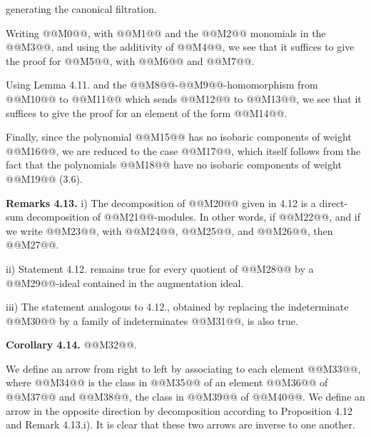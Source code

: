 generating the canonical filtration.

Writing @@M0@@, with @@M1@@ and the @@M2@@ monomials in the @@M3@@, and using the additivity of @@M4@@, we see that it suffices to give the proof for @@M5@@, with @@M6@@ and @@M7@@.

Using Lemma 4.11. and the @@M8@@-@@M9@@-homomorphism from @@M10@@ to @@M11@@ which sends @@M12@@ to @@M13@@, we see that it suffices to give the proof for an element of the form @@M14@@.

Finally, since the polynomial @@M15@@ has no isobaric components of weight @@M16@@, we are reduced to the case @@M17@@, which itself follows from the fact that the polynomials @@M18@@ have no isobaric components of weight @@M19@@ (3.6).

\textbf{Remarks 4.13.} i) The decomposition of @@M20@@ given in 4.12 is a direct-sum decomposition of @@M21@@-modules. In other words, if @@M22@@, and if we write @@M23@@, with @@M24@@, @@M25@@, and @@M26@@, then @@M27@@.

ii) Statement 4.12. remains true for every quotient of @@M28@@ by a @@M29@@-ideal contained in the augmentation ideal.

iii) The statement analogous to 4.12., obtained by replacing the indeterminate @@M30@@ by a family of indeterminates @@M31@@, is also true.

\textbf{Corollary 4.14.} @@M32@@.

We define an arrow from right to left by associating to each element @@M33@@, where @@M34@@ is the class in @@M35@@ of an element @@M36@@ of @@M37@@ and @@M38@@, the class in @@M39@@ of @@M40@@. We define an arrow in the opposite direction by decomposition according to Proposition 4.12 and Remark 4.13.i). It is clear that these two arrows are inverse to one another.

